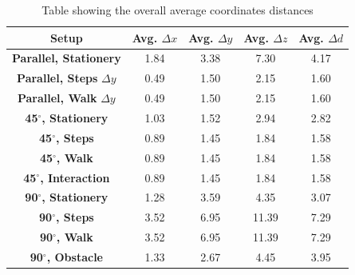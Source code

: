 \begin{table}[!h]
  \centering

  \begin{tabulary}{1.0\columnwidth}{||c c c c c||} 
  \hline
  \textbf{Setup} & Avg. $\Delta x$ & Avg. $\Delta y$ & Avg. $\Delta z$ & Avg. $\Delta d$ \\ [0.5ex] 
  \hline\hline
  \textbf{Parallel, Stationery} & 1.84 & 3.38 & 7.30 & 4.17 \\
  \hline
  \textbf{Parallel, Steps} $\Delta y$ & 0.49 & 1.50 & 2.15 & 1.60 \\
  \hline
  \textbf{Parallel, Walk} $\Delta y$ & 0.49 & 1.50 & 2.15 & 1.60 \\
  \hline
  \textbf{45$^{\circ}$, Stationery} & 1.03 & 1.52 & 2.94 & 2.82 \\
  \hline
  \textbf{45$^{\circ}$, Steps} & 0.89 & 1.45 & 1.84 & 1.58 \\
  \hline
  \textbf{45$^{\circ}$, Walk} & 0.89 & 1.45 & 1.84 & 1.58 \\
  \hline
  \textbf{45$^{\circ}$, Interaction} & 0.89 & 1.45 & 1.84 & 1.58 \\
  \hline
  \textbf{90$^{\circ}$, Stationery} & 1.28 & 3.59 & 4.35 & 3.07 \\
  \hline
  \textbf{90$^{\circ}$, Steps} & 3.52 & 6.95 & 11.39 & 7.29 \\
  \hline
  \textbf{90$^{\circ}$, Walk} & 3.52 & 6.95 & 11.39 & 7.29 \\
  \hline
  \textbf{90$^{\circ}$, Obstacle} & 1.33 & 2.67 & 4.45 & 3.95 \\
  \hline
  \end{tabulary}
  
  \caption{Table showing the overall average coordinates distances}
  
  \label{table:overall_coordinates_values}
\end{table}



